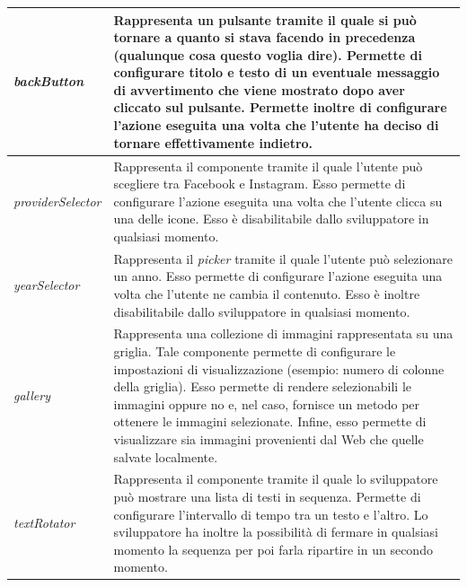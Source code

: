 				\begin{center}
					\begin{tabular}[H]{p{} p{}}
						\emph{backButton}		& Rappresenta un pulsante tramite il quale si può tornare a quanto si
										  stava facendo in precedenza (qualunque cosa questo voglia dire).
										  Permette di configurare titolo e testo di un eventuale messaggio di
										  avvertimento che viene mostrato dopo aver cliccato sul pulsante.
										  Permette inoltre di configurare l'azione eseguita una volta che
										  l'utente ha deciso di tornare effettivamente indietro.\\
						\hline
						\emph{providerSelector}		& Rappresenta il componente tramite il quale l'utente può scegliere
										  tra Facebook e Instagram. Esso permette di configurare l'azione
										  eseguita una volta che l'utente clicca su una delle icone. Esso è
										  disabilitabile dallo sviluppatore in qualsiasi momento.\\
						\hline
						\emph{yearSelector}		& Rappresenta il \emph{picker} tramite il quale l'utente può
										  selezionare un anno. Esso permette di configurare l'azione eseguita
										  una volta che l'utente ne cambia il contenuto. Esso è inoltre
										  disabilitabile dallo sviluppatore in qualsiasi momento.\\
						\hline
						\emph{gallery}			& Rappresenta una collezione di immagini rappresentata su una
										  griglia. Tale componente permette di configurare le impostazioni di
										  visualizzazione (esempio: numero di colonne della griglia). Esso
										  permette di rendere selezionabili le immagini oppure no e, nel
										  caso, fornisce un metodo per ottenere le immagini selezionate.
										  Infine, esso permette di visualizzare sia immagini provenienti dal
										  Web che quelle salvate localmente.\\
						\hline
						\emph{textRotator}		& Rappresenta il componente tramite il quale lo sviluppatore può
										  mostrare una lista di testi in sequenza. Permette di configurare
										  l'intervallo di tempo tra un testo e l'altro. Lo sviluppatore ha
										  inoltre la possibilità di fermare in qualsiasi momento la sequenza
										  per poi farla ripartire in un secondo momento.\\
					\end{tabular}
				\end{center}
